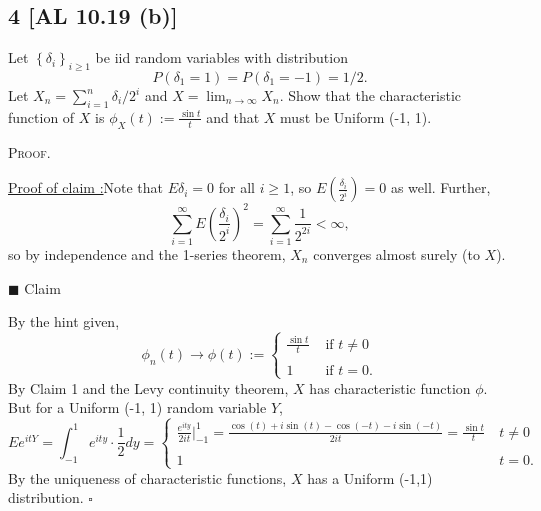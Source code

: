 \documentclass[12pt]{article}
\newcounter{ProofCounter}
\newcounter{ClaimCounter}[ProofCounter]
\newenvironment{Proof}{\stepcounter{ProofCounter}\textsc{Proof.}}{\hfill$\square$}
\newenvironment{claim}[1]{\vspace{1mm}\stepcounter{ClaimCounter}\par\noindent\underline{\bf Claim \theClaimCounter:}\space#1}{}
\newenvironment{claimproof}[1]{\par\noindent\underline{Proof of claim \theClaimCounter:}\space#1}{\hfill $\blacksquare$ Claim \theClaimCounter}
\begin{document}
\newpage
\subsection*{4 [AL 10.19 (b)]}
\begin{tcolorbox}
  Let $\left\{ \delta_i \right\}_{i\geq 1}$ be iid random variables with distribution
  \[ P(\delta_1 = 1) = P(\delta_1 = -1) = 1/2. \]
  Let $X_n = \sum_{i=1}^{n}\delta_i / 2^{i}$ and $X = \lim_{n\rightarrow\infty}X_n$. Show that the characteristic function of $X$ is $\phi_X(t) :=
  \frac{\sin t}{t}$ and that $X$ must be Uniform (-1, 1).
\end{tcolorbox}
\begin{Proof}
  \begin{claimproof}
    Note that $E\delta_i = 0$ for all $i \geq 1$, so $E\left(\frac{\delta_i}{2^{i}}\right) = 0$ as well. Further,
    \[ \sum_{i=1}^{\infty}E\left( \frac{\delta_i}{2^{i}} \right)^{2} = \sum_{i=1}^{\infty}\frac{1}{2^{2i}} < \infty, \]
    so by independence and the 1-series theorem, $X_n$ converges almost surely (to $X$).

  \end{claimproof}

  By the hint given,
  \[
    \phi_n(t) \rightarrow \phi(t) := \left\{ \begin{array}{cl}
        \frac{\sin t}{t} & \text{ if } t \neq 0 \\
        \\
        1 & \text{ if } t = 0.
    \end{array} \right.
  \]
  By Claim 1 and the Levy continuity theorem, $X$ has characteristic function $\phi$. But for a Uniform (-1, 1) random variable $Y$,
  \[
    Ee^{itY} = \int_{-1}^{1}e^{ity}\cdot \frac{1}{2} dy = \left\{ \begin{array}{cl}
        \frac{e^{ity}}{2it}\bigg|_{-1}^{1} = \frac{\cos(t) + i\sin(t) - \cos(-t) - i\sin(-t)}{2it} = \frac{\sin t}{t} & \ t \neq 0 \\
        \\
        1 & \ t = 0.
    \end{array} \right.
  \]
  By the uniqueness of characteristic functions, $X$ has a Uniform (-1,1) distribution.
\end{Proof}
\end{document}
